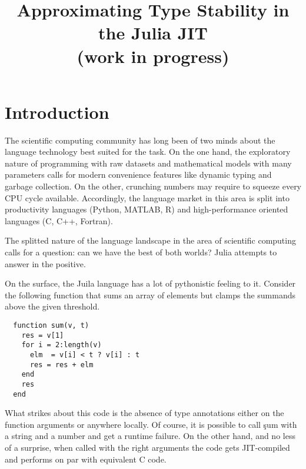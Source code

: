 \documentclass[sigplan,screen]{acmart}
\begin{document}
\title[Approximating Type Stability in the Julia JIT (work in progress)]%
{Approximating Type Stability in the Julia JIT\\(work in progress)}



\maketitle

\section{Introduction}

The scientific computing community has long been of two minds about the language
technology best suited for the task. On the one hand, the exploratory nature of
programming with raw datasets and mathematical models with many parameters calls
for modern convenience features like dynamic typing and garbage collection. On
the other, crunching numbers may require to squeeze every CPU cycle available.
Accordingly, the language market in this area is split into productivity
languages (Python, MATLAB, R) and high-performance oriented languages (C,
C++, Fortran).

The splitted nature of the language landscape in the area of scientific
computing calls for a question: can we have the best of both worlds? Julia
attempts to answer in the positive.

On the surface, the Juila language has a lot of pythonistic feeling to it.
Consider the following function that sums an array of elements but clamps the
summands above the given threshold.
%
\begin{verbatim}
  function sum(v, t)
    res = v[1]
    for i = 2:length(v)
      elm  = v[i] < t ? v[i] : t
      res = res + elm
    end
    res
  end
\end{verbatim}
%
What strikes about this code is the absence of type annotations either on the
function arguments or anywhere locally. Of course, it is possible to call
\c{sum} with a string and a number and get a runtime failure. On the other hand,
and no less of a surprise, when called with the right arguments the code gets
JIT-compiled and performs on par with equivalent C code.
\end{document}
